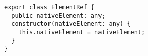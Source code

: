 \begin{verbatim}
export class ElementRef {
  public nativeElement: any;
  constructor(nativeElement: any) {
    this.nativeElement = nativeElement;
  }
}
\end{verbatim}
